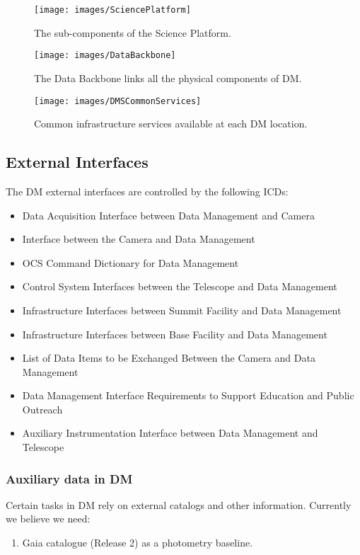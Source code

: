 \begin{figure}[htbp]
\begin{center}
\texttt{[image: images/SciencePlatform]}
\caption{The sub-components of the Science Platform. \label{fig:sciplat}}
\end{center}
\end{figure}


\begin{figure}[htbp]
\begin{center}
\texttt{[image: images/DataBackbone]}
\caption{The Data Backbone links all the physical components of DM. \label{fig:databb}}
\end{center}
\end{figure}

\begin{figure}[htbp]
\begin{center}
 \texttt{[image: images/DMSCommonServices]}
\caption{Common infrastructure services available at each DM location. \label{fig:dcs}}
\end{center}
\end{figure}



\subsection{External Interfaces}
The DM external interfaces are controlled by the following ICDs:
\begin{itemize}
	\item[\citeds{LSE-68}] Data Acquisition Interface between Data Management and Camera
	\item[\citeds{LSE-69}] Interface between the Camera and Data Management	 
	\item[\citeds{LSE-72}] OCS Command Dictionary for Data Management
	\item[\citeds{LSE-75}] Control System Interfaces between the Telescope and Data Management
	\item[\citeds{LSE-76}] Infrastructure Interfaces between Summit Facility and Data Management
	\item[\citeds{LSE-77}] Infrastructure Interfaces between Base Facility and Data Management
	\item[\citeds{LSE-130}] List of Data Items to be Exchanged Between the Camera and Data Management
	\item[\citeds{LSE-131}] Data Management Interface Requirements to Support Education and Public Outreach 
	\item[\citeds{LSE-140}] Auxiliary Instrumentation Interface between Data Management and Telescope
\end{itemize}

\subsubsection{Auxiliary data in DM}
Certain tasks in DM rely on external catalogs and other information. Currently we believe we need:
\begin{enumerate}
		        \item Gaia catalogue (Release 2) as a photometry baseline.
		\end{enumerate}
